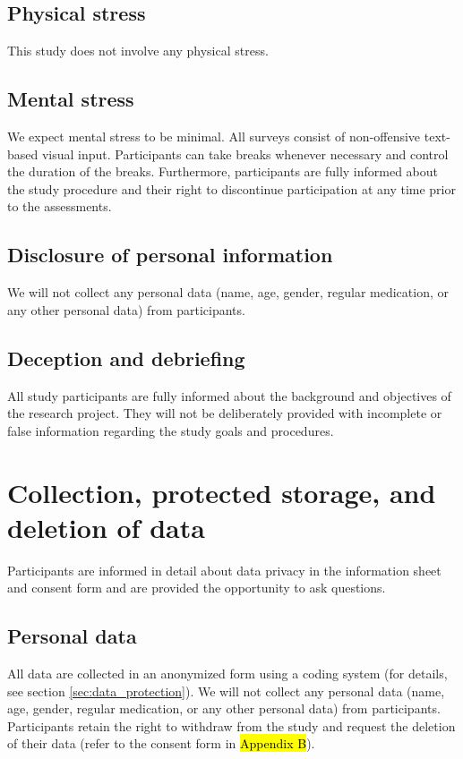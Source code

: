 \documentclass[11pt,twoside,a4paper]{article}
\begin{document}
\subsection{Physical stress}

This study does not involve any physical stress.

\subsection{Mental stress}

We expect mental stress to be minimal.
All surveys consist of non-offensive text-based visual input.
Participants can take breaks whenever necessary and control the duration of the breaks.
Furthermore, participants are fully informed about the study procedure and their right to discontinue participation at any time prior to the assessments.

\subsection{Disclosure of personal information}

We will not collect any personal data (name, age, gender, regular medication, or any other personal data) from participants.

\subsection{Deception and debriefing}

All study participants are fully informed about the background and objectives of the research project.
They will not be deliberately provided with incomplete or false information regarding the study goals and procedures.

\section{Collection, protected storage, and deletion of data}

Participants are informed in detail about data privacy in the information sheet and consent form and are provided the opportunity to ask questions.

\subsection{Personal data}

All data are collected in an anonymized form using a coding system (for details, see section \ref{sec:data_protection}).
We will not collect any personal data (name, age, gender, regular medication, or any other personal data) from participants.
Participants retain the right to withdraw from the study and request the deletion of their data (refer to the consent form in \hl{Appendix B}).
\end{document}
